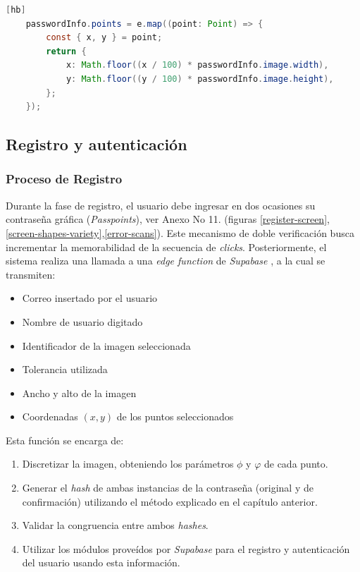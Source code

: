 \begin{lstlisting}[style=mystyle, language=Java, caption=C\'odigo de transformaci\'on en coordenadas de imagen, label=point-capture2][hb]
	passwordInfo.points = e.map((point: Point) => {
		const { x, y } = point;
		return {
			x: Math.floor((x / 100) * passwordInfo.image.width),
			y: Math.floor((y / 100) * passwordInfo.image.height),
		};
	});
\end{lstlisting}

\subsection{Registro y autenticaci\'on}
\subsubsection{Proceso de Registro}
Durante la fase de registro, el usuario debe ingresar en dos ocasiones su contraseña gráfica (\textit{Passpoints}), ver Anexo No 11. (figuras \ref{register-screen},  \ref{screen-shapes-variety},\ref{error-scans}). Este mecanismo de doble verificación busca incrementar la memorabilidad de la secuencia de \textit{clicks}. Posteriormente, el sistema realiza una llamada a una \textit{edge function} de \textit{Supabase} , a la cual se transmiten:

\begin{itemize}
	\item Correo insertado por el usuario
	\item Nombre de usuario digitado
	\item Identificador de la imagen seleccionada
	\item Tolerancia utilizada 
	\item Ancho y alto de la imagen
	\item Coordenadas $(x,y)$ de los puntos seleccionados
\end{itemize}

Esta función se encarga de: 
\begin{enumerate}
	\item Discretizar la imagen, obteniendo los parámetros $\phi$  y $\varphi$ de cada punto.
	\item Generar el \textit{hash} de ambas instancias de la contraseña (original y de confirmación) utilizando el m\'etodo explicado en el cap\'itulo anterior.
	\item Validar la congruencia entre ambos \textit{hashes}.
	\item Utilizar los m\'odulos prove\'idos por \textit{Supabase}  para el registro y autenticaci\'on del usuario usando esta informaci\'on.
\end{enumerate}

